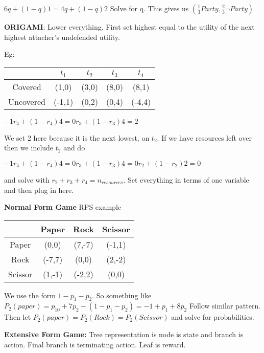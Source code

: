 \documentclass[12pt,letter]{article}
\begin{document}
\begin{multicols}{2}
$6q + (1-q)1 = 4q + (1-q)2$ Solve for q. This gives us $(\frac13 Party, \frac23\neg Party)$

\textbf{ORIGAMI}: Lower everything. First set highest equal to the utility of 
the next highest attacher's undefended utility. 

Eg:
\begin{tabular}{|c|c|c|c|c|}
    \hline
     & $t_1$ & $t_2$ & $t_3$ & $t_4$\\\hline
     Covered & (1,0) & (3,0) & (8,0) & (8,1)\\\hline
     Uncovered & (-1,1) & (0,2) & (0,4) & (-4,4)\\\hline
\end{tabular}

$ -1r_4 + (1-r_4)4 = 0r_3 + (1-r_3)4 = 2$

We set 2 here because it is the next lowest, on $t_2$. If we have resources 
left over then we include $t_2$ and do

$ -1r_4 + (1-r_4)4 = 0r_3 + (1-r_3)4 = 0r_2 + (1-r_2)2 = 0$

and solve with $r_2 + r_3 + r_4 = n_{resources}$. Set everything in terms of one
variable and then plug in here.

\textbf{Normal Form Game} RPS example

\begin{tabular}{|c|c|c|c|}
    \hline
    & Paper & Rock & Scissor\\\hline
    Paper & (0,0) & (7,-7) & (-1,1)\\\hline
    Rock & (-7,7) & (0,0) & (2,-2)\\\hline
    Scissor & (1,-1) & (-2,2) & (0,0)\\\hline
\end{tabular}

We use the form $1-p_1-p_2$. So something like 
$P_2(paper) = p_10 + 7p_2 - (1-p_1-p_2) = -1 + p_1 + 8p_2$
Follow similar pattern. Then let $P_2(paper) = P_2(Rock) = P_2(Scissor)$ and solve
for probabilities.

\textbf{Extensive Form Game:} Tree representation is node is state and branch
is action. Final branch is terminating action. Leaf is reward. 



\end{multicols}
\end{document}
